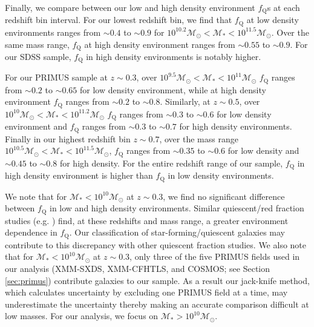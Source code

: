 
Finally, we compare between our low and high density environment
$f_{\mathrm{Q}}$s at each redshift bin interval. For our lowest redshift
bin, we find that $f_{\mathrm{Q}}$ at low density environments ranges from
$\sim 0.4$ to $\sim 0.9$ for $10^{10.2} \mathcal{M}_{\odot} <
\mathcal{M}_{*} < 10^{11.5} \mathcal{M}_{\odot}$. Over the same mass
range, $f_{\mathrm{Q}}$ at high density environment ranges from $\sim
0.55$ to $\sim 0.9$. For our SDSS sample, $f_{\mathrm{Q}}$ in
high density environments is notably higher. 

For our PRIMUS sample at $z \sim 0.3$, over $10^{9.5} \mathcal{M}_{\odot} < \mathcal{M}_{*} < 10^{11} \mathcal{M}_{\odot}$ $f_{\mathrm{Q}}$ ranges from $\sim 0.2$ to $\sim 0.65$ for low density environment, while at high density environment $f_{\mathrm{Q}}$ ranges from $\sim 0.2$ to $\sim 0.8$. Similarly, at $z \sim 0.5$, over $10^{10} \mathcal{M}_{\odot} < \mathcal{M}_{*} < 10^{11.2} \mathcal{M}_{\odot}$ $f_{\mathrm{Q}}$ ranges from $\sim 0.3$ to $\sim 0.6$ for low density environment and $f_{\mathrm{Q}}$ ranges from $\sim 0.3$ to $\sim 0.7$ for high density environments. Finally in our highest redshift bin $z \sim 0.7$, over the mass range $10^{10.5} \mathcal{M}_{\odot} < \mathcal{M}_{*} < 10^{11.5} \mathcal{M}_{\odot}$, $f_{\mathrm{Q}}$ ranges from $\sim 0.35$ to $\sim 0.6$ for low density and $\sim 0.45$ to $\sim 0.8$ for high density. For the entire redshift range of our sample, $f_{\mathrm{Q}}$ in high density environment is higher than $f_{\mathrm{Q}}$ in low density environments. 

We note that for $\mathcal{M}_* < 10^{10} \mathcal{M}_{\odot}$ at $z \sim 0.3$, we find no significant difference between $f_\mathrm{Q}$ in low and high density environments. Similar quiescent/red fraction studies (e.g. \citealt{Baldry:2006aa, Cucciati:2010aa}) find, at these redshifts and mass range, a greater environment dependence in $f_\mathrm{Q}$. Our classification of star-forming/quiescent galaxies may contribute to this discrepancy with other quiescent fraction studies. We also note that for $\mathcal{M}_* < 10^{10} \mathcal{M}_{\odot}$ at $z \sim 0.3$, only three of the five PRIMUS fields used in our analysis (XMM-SXDS, XMM-CFHTLS, and COSMOS; see Section \ref{sec:primus}) contribute galaxies to our sample. As a result our jack-knife method, which calculates uncertainty by excluding one PRIMUS field at a time, may underestimate the uncertainty thereby making an accurate comparison difficult at low masses. For our analysis, we focus on $\mathcal{M}_* > 10^{10} \mathcal{M}_\odot$.


